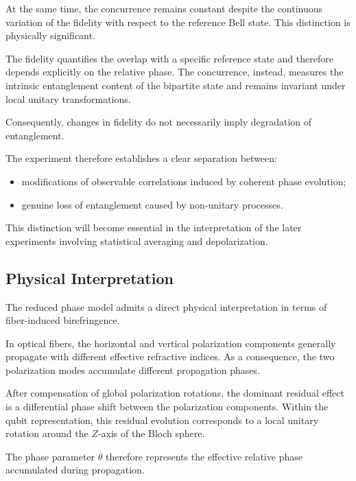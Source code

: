 At the same time, the concurrence remains constant despite the continuous variation of the fidelity with respect to the reference Bell state. This distinction is physically significant.

The fidelity quantifies the overlap with a specific reference state and therefore depends explicitly on the relative phase. The concurrence, instead, measures the intrinsic entanglement content of the bipartite state and remains invariant under local unitary transformations.

Consequently, changes in fidelity do not necessarily imply degradation of entanglement.

The experiment therefore establishes a clear separation between:

\begin{itemize}
    \item modifications of observable correlations induced by coherent phase evolution;
    \item genuine loss of entanglement caused by non-unitary processes.
\end{itemize}

This distinction will become essential in the interpretation of the later experiments involving statistical averaging and depolarization.


\subsection*{Physical Interpretation}

The reduced phase model admits a direct physical interpretation in terms of fiber-induced birefringence.

In optical fibers, the horizontal and vertical polarization components generally propagate with different effective refractive indices. As a consequence, the two polarization modes accumulate different propagation phases.

After compensation of global polarization rotations, the dominant residual effect is a differential phase shift between the polarization components. Within the qubit representation, this residual evolution corresponds to a local unitary rotation around the \(Z\)-axis of the Bloch sphere.

The phase parameter \( \theta \) therefore represents the effective relative phase accumulated during propagation.

